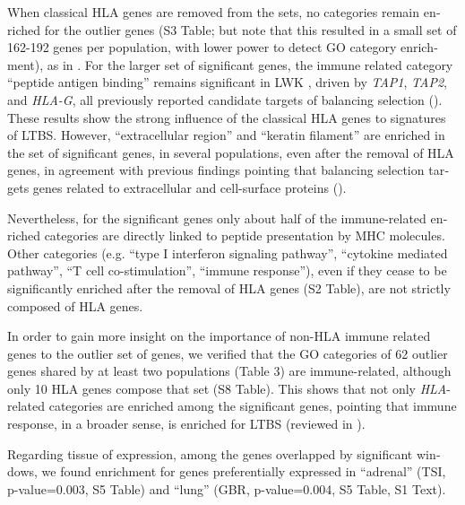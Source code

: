 \begin{refsection}
\begin{otherlanguage}{english}
When classical HLA genes are removed from the sets, no categories remain enriched for the outlier genes (S3 Table; but note that this resulted in a small set of 162-192 genes per population, with lower power to detect GO
category enrichment), as in \textcite{DeGiorgio2014}. For the larger set of significant genes, the immune related category “peptide antigen
binding” remains significant in LWK , driven by \emph{TAP1}, \emph{TAP2}, and \emph{HLA-G}, all previously reported candidate targets of balancing selection (\cite{Cagliani2011a,Tan2005}). These results
show the strong influence of the classical HLA genes to signatures of LTBS. However, “extracellular region” and “keratin filament” are enriched in the set of significant genes, in several populations, even after the removal of HLA genes, in agreement with previous findings pointing that balancing selection targets genes related to extracellular and cell-surface
proteins (\cite{Key2014b}).

Nevertheless, for the significant genes only about half of the immune-related enriched categories are directly linked to peptide presentation by MHC molecules. Other categories (e.g. “type I interferon signaling pathway”, “cytokine mediated pathway”, “T cell co-stimulation”, “immune response”), even if they cease to be significantly enriched after the removal of HLA genes (S2 Table), are not strictly composed of HLA genes. 

In order to gain more insight on the importance of non-HLA immune related genes to the outlier set of genes, we verified that the GO categories of 62 outlier genes shared by at least two populations (Table 3) are immune-related, although only 10 HLA genes compose that set (S8 Table). This shows that not only \emph{HLA}-related categories are enriched among the significant genes,
pointing that immune response, in a broader sense, is enriched for LTBS (reviewed in \cite{Key2014b}).

Regarding tissue of expression, among the genes overlapped by significant windows, we found enrichment for genes preferentially expressed in “adrenal” (TSI, p-value=0.003, S5 Table) and “lung” (GBR, p-value=0.004, S5 Table, S1 Text).



\end{otherlanguage}
\end{refsection}
